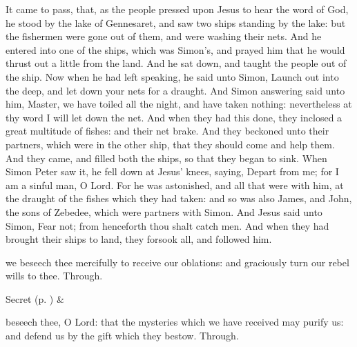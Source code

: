 \clearpage
{}
 It came to pass, that, as the people pressed upon Jesus to hear the word of God, he stood by the lake of Gennesaret, and saw two ships standing by the lake: but the fishermen were gone out of them, and were washing their nets. And he entered into one of the ships, which was Simon's, and prayed him that he would thrust out a little from the land. And he sat down, and taught the people out of the ship. Now when he had left speaking, he said unto Simon, Launch out into the deep, and let down your nets for a draught. And Simon answering said unto him, Master, we have toiled all the night, and have taken nothing: nevertheless at thy word I will let down the net. And when they had this done, they inclosed a great multitude of fishes: and their net brake. And they beckoned unto their partners, which were in the other ship, that they should come and help them. And they came, and filled both the ships, so that they began to sink. When Simon Peter saw it, he fell down at Jesus' knees, saying, Depart from me; for I am a sinful man, O Lord. For he was astonished, and all that were with him, at the draught of the fishes which they had taken: and so was also James, and John, the sons of Zebedee, which were partners with Simon. And Jesus said unto Simon, Fear not; from henceforth thou shalt catch men. And when they had brought their ships to land, they forsook all, and followed him.


\secret
{} we beseech thee mercifully to receive our oblations: and graciously turn our rebel wills to thee. Through.


\begin{rubric}
     Secret  (p. \pageref{SPSaints}) \&  
\end{rubric}


\postcommunion
{} beseech thee, O Lord: that the mysteries which we have received may purify us: and defend us by the gift which they bestow. Through.


